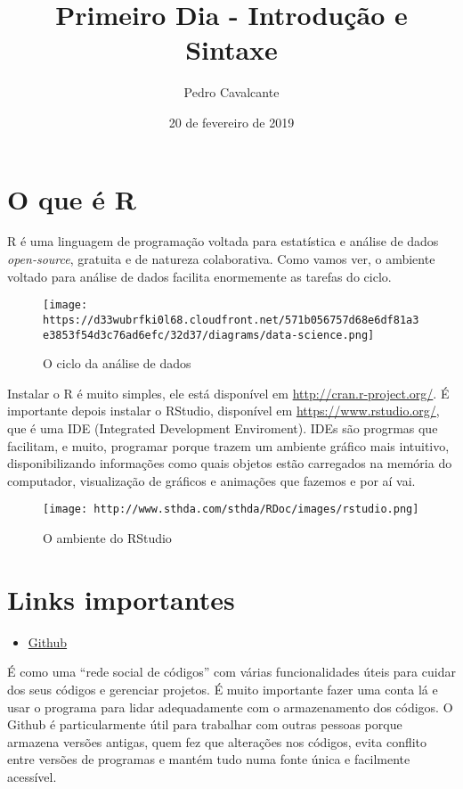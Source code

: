 \documentclass[]{article}
\title{Primeiro Dia - Introdução e Sintaxe}
\author{Pedro Cavalcante}
\date{20 de fevereiro de 2019}
\providecommand{\tightlist}{%
  \setlength{\itemsep}{0pt}\setlength{\parskip}{0pt}}
\begin{document}
\maketitle

\hypertarget{o-que-e-r}{%
\section{O que é R}\label{o-que-e-r}}

R é uma linguagem de programação voltada para estatística e análise de
dados \emph{open-source}, gratuita e de natureza colaborativa. Como
vamos ver, o ambiente voltado para análise de dados facilita enormemente
as tarefas do ciclo.

\begin{figure}
\centering
\texttt{[image: https://d33wubrfki0l68.cloudfront.net/571b056757d68e6df81a3e3853f54d3c76ad6efc/32d37/diagrams/data-science.png]}
\caption{O ciclo da análise de dados}
\end{figure}

Instalar o R é muito simples, ele está disponível em
\url{http://cran.r-project.org/}. É importante depois instalar o
RStudio, disponível em \url{https://www.rstudio.org/}, que é uma IDE
(Integrated Development Enviroment). IDEs são progrmas que facilitam, e
muito, programar porque trazem um ambiente gráfico mais intuitivo,
disponibilizando informações como quais objetos estão carregados na
memória do computador, visualização de gráficos e animações que fazemos
e por aí vai.

\begin{figure}
\centering
\texttt{[image: http://www.sthda.com/sthda/RDoc/images/rstudio.png]}
\caption{O ambiente do RStudio}
\end{figure}

\hypertarget{links-importantes}{%
\section{Links importantes}\label{links-importantes}}

\begin{itemize}
\tightlist
\item
  \href{https://github.com}{Github}
\end{itemize}

É como uma ``rede social de códigos'' com várias funcionalidades úteis
para cuidar dos seus códigos e gerenciar projetos. É muito importante
fazer uma conta lá e usar o programa para lidar adequadamente com o
armazenamento dos códigos. O Github é particularmente útil para
trabalhar com outras pessoas porque armazena versões antigas, quem fez
que alterações nos códigos, evita conflito entre versões de programas e
mantém tudo numa fonte única e facilmente acessível.
\end{document}
